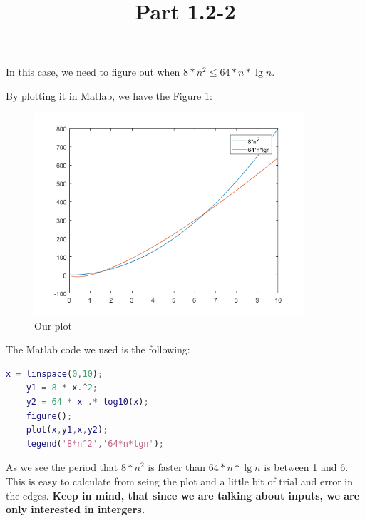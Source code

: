 \documentclass{article}
\title{Part 1.2-2}
\begin{document}
\date{}
\author{}

\maketitle

In this case, we need to figure out when $ 8 * n^{2} \leq 64* n * \lg{n} $.

By plotting it in Matlab, we have the Figure \ref{fig:plot1}:

\begin{figure}
    \includegraphics[width=10cm]{images/1-2-2.png}
    \centering
    \caption{Our plot}
    \label{fig:plot1}
\end{figure}

The Matlab code we used is the following:

\begin{lstlisting}[language=Matlab]
    x = linspace(0,10);
    y1 = 8 * x.^2;
    y2 = 64 * x .* log10(x);
    figure();
    plot(x,y1,x,y2);
    legend('8*n^2','64*n*lgn');
\end{lstlisting}

As we see the period that $8*n^{2}$ is faster than $64*n*\lg{n}$ is between 1 and 6. This is easy to calculate from seing the plot and a little bit of trial and error in the edges. \textbf{Keep in mind, that since we are talking about inputs, we are only interested in intergers.}
\end{document}
